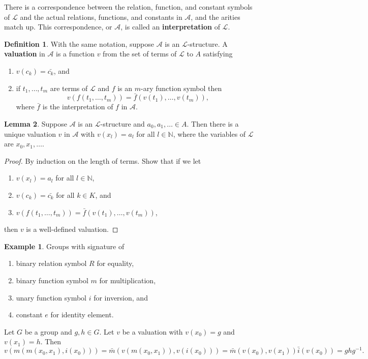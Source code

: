 \documentclass{article}
\newcommand{\N}{\mathbb{N}}
\newcommand{\rb}[1]{\left( #1 \right)}
\theoremstyle{definition}\newtheorem{definition}{Definition}[subsection]
\theoremstyle{definition}\newtheorem{remark}[definition]{Remark}
\theoremstyle{definition}\newtheorem*{example}{Example}
\theoremstyle{definition}\newtheorem*{note}{Note}
\newtheorem{lemma}[definition]{Lemma}
\begin{document}
There is a correspondence between the relation, function, and constant symbols of $ \mathcal{L} $ and the actual relations, functions, and constants in $ \mathcal{A} $, and the arities match up. This correspondence, or $ \mathcal{A} $, is called an \textbf{interpretation} of $ \mathcal{L} $.

\begin{definition}
With the same notation, suppose $ \mathcal{A} $ is an $ \mathcal{L} $-structure. A \textbf{valuation} in $ \mathcal{A} $ is a function $ v $ from the set of terms of $ \mathcal{L} $ to $ A $ satisfying
\begin{enumerate}
\item $ v\rb{c_k} = \bar{c_k} $, and
\item if $ t_1, \dots, t_m $ are terms of $ \mathcal{L} $ and $ f $ is an $ m $-ary function symbol then
$$ v\rb{f\rb{t_1, \dots, t_m}} = \bar{f}\rb{v\rb{t_1}, \dots, v\rb{t_m}}, $$
where $ \bar{f} $ is the interpretation of $ f $ in $ \mathcal{A} $.
\end{enumerate}
\end{definition}

\begin{lemma}
Suppose $ \mathcal{A} $ is an $ \mathcal{L} $-structure and $ a_0, a_1, \dots \in A $. Then there is a unique valuation $ v $ in $ \mathcal{A} $ with $ v\rb{x_l} = a_l $ for all $ l \in \N $, where the variables of $ \mathcal{L} $ are $ x_0, x_1, \dots $.
\end{lemma}

\begin{proof}
By induction on the length of terms. Show that if we let
\begin{enumerate}
\item $ v\rb{x_l} = a_l $ for all $ l \in \N $,
\item $ v\rb{c_k} = \bar{c_k} $ for all $ k \in K $, and
\item $ v\rb{f\rb{t_1, \dots, t_m}} = \bar{f}\rb{v\rb{t_1}, \dots, v\rb{t_m}} $,
\end{enumerate}
then $ v $ is a well-defined valuation.
\end{proof}

\begin{example}
Groups with signature of
\begin{enumerate}
\item binary relation symbol $ R $ for equality,
\item binary function symbol $ m $ for multiplication,
\item unary function symbol $ i $ for inversion, and
\item constant $ e $ for identity element.
\end{enumerate}
Let $ G $ be a group and $ g, h \in G $. Let $ v $ be a valuation with $ v\rb{x_0} = g $ and $ v\rb{x_1} = h $. Then
$$ v\rb{m\rb{m\rb{x_0, x_1}, i\rb{x_0}}} = \bar{m}\rb{v\rb{m\rb{x_0, x_1}}, v\rb{i\rb{x_0}}} = \bar{m}\rb{v\rb{x_0}, v\rb{x_1}}\bar{i}\rb{v\rb{x_0}} = ghg^{-1}. $$
\end{example}
\end{document}

